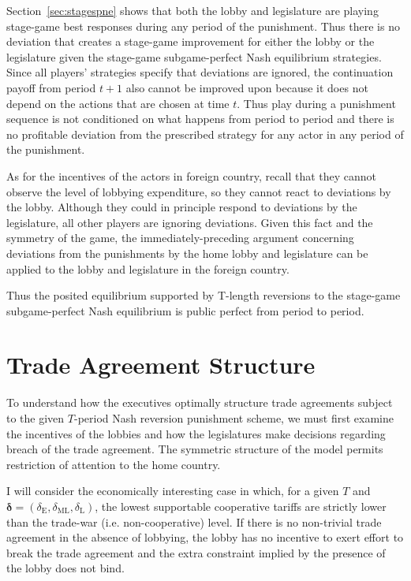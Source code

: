\documentclass[authoryear, review]{elsarticle}
\newcommand{\de}{\delta}
\begin{document}
Section~\ref{sec:stagespne} shows that both the lobby and legislature are playing stage-game best responses during any period of the punishment. Thus there is no deviation that creates a stage-game improvement for either the lobby or the legislature given the stage-game subgame-perfect Nash equilibrium strategies. Since all players' strategies specify that deviations are ignored, the continuation payoff from period $t+1$ also cannot be improved upon because it does not depend on the actions that are chosen at time $t$. Thus play during a punishment sequence is not conditioned on what happens from period to period and there is no profitable deviation from the prescribed strategy for any actor in any period of the punishment.

As for the incentives of the actors in foreign country, recall that they cannot observe the level of lobbying expenditure, so they cannot react to deviations by the lobby. Although they could in principle respond to deviations by the legislature, all other players are ignoring deviations. Given this fact and the symmetry of the game, the immediately-preceding argument concerning deviations from the punishments by the home lobby and legislature can be applied to the lobby and legislature in the foreign country.

Thus the posited equilibrium supported by T-length reversions to the stage-game subgame-perfect Nash equilibrium is public perfect from period to period.

\section{Trade Agreement Structure}
\label{sec:structure}
To understand how the executives optimally structure trade agreements subject to the given $T$-period Nash reversion punishment scheme, we must first examine the incentives of the lobbies and how the legislatures make decisions regarding breach of the trade agreement. The symmetric structure of the model permits restriction of attention to the home country.

I will consider the economically interesting case in which, for a given $T$ and $\bm{\de}=\left(\de_\text{E},\de_\text{ML},\de_\text{L}\right)$, the lowest supportable cooperative tariffs are strictly lower than the trade-war (i.e. non-cooperative) level. If there is no non-trivial trade agreement in the absence of lobbying, the lobby has no incentive to exert effort to break the trade agreement and the extra constraint implied by the presence of the lobby does not bind.
\end{document}
